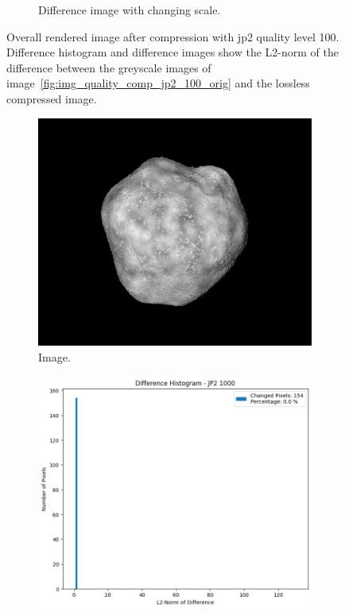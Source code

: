 \begin{figure}[htb]
\begin{subfigure}[b]{0.48\textwidth}
        \caption{Difference image with changing scale.}
        \label{fig:img_quality_comp_jp2_100_diff_rel}
    \end{subfigure}
    \caption{Overall rendered image after compression with \gls{jp2} quality level 100. Difference histogram and difference images show the L2-norm of the difference between the greyscale images of image~\ref{fig:img_quality_comp_jp2_100_orig} and the lossless compressed image.}
    \label{fig:img_quality_comp_jp2_100}
\end{figure}

\begin{figure}[htb]
    \centering
    \begin{subfigure}[b]{0.48\textwidth}
        \centering
        \includegraphics[width=\textwidth]{doc/thesis/0_figures/compare_quality/set1/jp2_1000.png}
        \caption{Image.}
        \label{fig:img_quality_comp_jp2_1000_orig}
    \end{subfigure}
    \begin{subfigure}[b]{0.48\textwidth}
        \centering
        \includegraphics[width=\textwidth]{doc/thesis/0_figures/compare_quality/set1/jp2_1000_diff_histogram.png}

\end{subfigure}
\end{figure}
